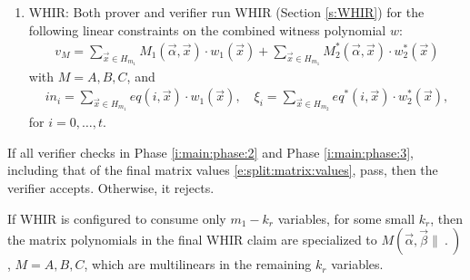 \begin{protocol}
\begin{enumerate}
\item 
\label{i:main:phase:3}
WHIR: 
Both prover and verifier run WHIR (Section \ref{s:WHIR}) for the following linear constraints on the combined witness polynomial $w$:
\begin{align}
\label{e:phase3:claim:vM}
v_M = \sum_{\vec x\in H_{m_1}} M_1(\vec\alpha, \vec x) \cdot w_1(\vec x) + \sum_{\vec x\in H_{m_1}} M_2^*(\vec\alpha,\vec x)\cdot w_2^*(\vec x)
\end{align}
with $M = A,B,C$, and
\begin{align}
\label{e:phase3:claim:inputs}
in_i = \sum_{\vec x \in H_{m_1}} eq(i, \vec x) \cdot w_1(\vec x),
\quad 
\xi_i = \sum_{\vec x \in H_{m_2}} eq^*(i, \vec x) \cdot w_2^*(\vec x),
\end{align}
for $i = 0,\ldots, t$.
\end{enumerate}
If all verifier checks in Phase \ref{i:main:phase:2} and Phase \ref{i:main:phase:3}, including that of the final matrix values \eqref{e:split:matrix:values}, pass, then the verifier accepts.
Otherwise, it rejects.
\end{protocol}


\begin{rem}
\label{rem:WHIR:not all variables consumed}
If WHIR is configured to consume only $m_1-k_r$ variables, for some small $k_r$, then the matrix polynomials in the final WHIR claim are specialized to $M(\vec\alpha, \vec\beta\|\:.\:)$, $M=A,B,C$, which are multilinears in the remaining $k_r$ variables. 
\end{rem}



